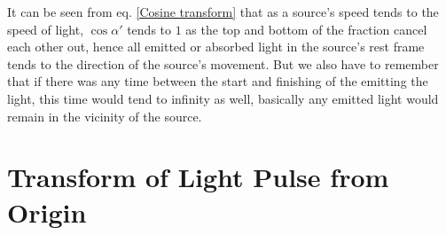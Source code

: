 It can be seen from eq. \eqref{Cosine transform} that as a source's speed tends to the speed of light, $\cos\alpha'$ tends to $1$ as the top and bottom of the fraction cancel each other out, hence all emitted or absorbed light in the source's rest frame tends to the direction of the source's movement. But we also have to remember that if there was any time between the start and finishing of the emitting the light, this time would tend to infinity as well, basically any emitted light would remain in the vicinity of the source.



\section{Transform of Light Pulse from Origin}

